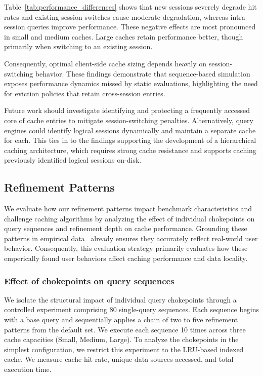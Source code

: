 Table~\ref{tab:performance_differences} shows that new sessions
severely degrade hit rates and existing session switches cause
moderate degradation, whereas intra-session queries improve performance.
These negative effects are most pronounced in small and medium caches.
Large caches retain performance better, though primarily when switching
to an existing session.

Consequently, optimal client-side cache sizing depends heavily on session-switching behavior. 
These findings demonstrate that sequence-based simulation exposes performance dynamics missed by static evaluations, 
highlighting the need for eviction policies that retain cross-session entries.

Future work should investigate identifying and protecting a
frequently accessed core of cache entries to mitigate
session-switching penalties.
Alternatively, query engines could identify logical sessions dynamically
and maintain a separate cache for each.
This ties in to the findings supporting the development of a hierarchical caching architecture, which
requires strong cache resistance and supports caching previously identified logical sessions on-disk.


\subsection{Refinement Patterns}

We evaluate how our refinement patterns impact benchmark characteristics and challenge caching algorithms 
by analyzing the effect of individual chokepoints on query sequences and refinement depth on cache performance.
Grounding these patterns in empirical data~\cite{arenas2025exploring} already ensures they accurately reflect real-world user behavior.
Consequently, this evaluation strategy primarily evaluates how these emperically found user behaviors affect caching performance and data locality.

\subsubsection{Effect of chokepoints on query sequences}

We isolate the structural impact of individual query chokepoints 
through a controlled experiment comprising 80 single-query sequences. 
Each sequence begins with a base query 
and sequentially applies a chain of two to five refinement patterns from the default set. 
We execute each sequence 10 times across three cache capacities (Small, Medium, Large). 
To analyze the chokepoints in the simplest configuration, 
we restrict this experiment to the LRU-based indexed cache. 
We measure cache hit rate, unique data sources accessed, and total execution time.

